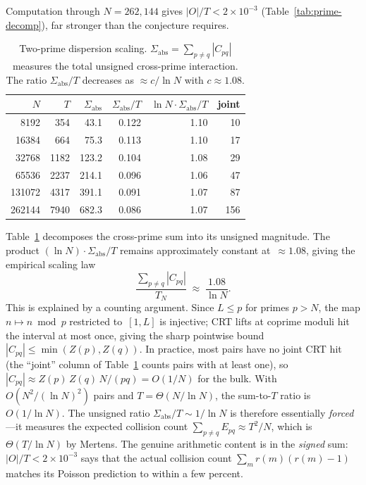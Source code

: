 \documentclass[11pt]{article}
\theoremstyle{definition}
\theoremstyle{remark}
\begin{document}
\noindent
Computation through $N = 262{,}144$
gives $|O|/T < 2 \times 10^{-3}$
(Table~\ref{tab:prime-decomp}),
far stronger than the
conjecture requires.

\begin{table}[ht]
\centering\small
\caption{Two-prime dispersion scaling.
$\Sigma_{\mathrm{abs}} =
\sum_{p \ne q} |C_{pq}|$
measures the total unsigned
cross-prime interaction.
The ratio
$\Sigma_{\mathrm{abs}}/T$
decreases as $\approx c/\ln N$
with $c \approx 1.08$.}
\label{tab:two-prime-scaling}
\begin{tabular}{rrrrrr}
\toprule
$N$ & $T$ &
$\Sigma_{\mathrm{abs}}$ &
$\Sigma_{\mathrm{abs}}/T$ &
$\ln N \cdot \Sigma_{\mathrm{abs}}/T$ &
joint \\
\midrule
8192 & 354 & 43.1 & 0.122 & 1.10 & 10 \\
16384 & 664 & 75.3 & 0.113 & 1.10 & 17 \\
32768 & 1182 & 123.2 & 0.104 & 1.08 & 29 \\
65536 & 2237 & 214.1 & 0.096 & 1.06 & 47 \\
131072 & 4317 & 391.1 & 0.091 & 1.07 & 87 \\
262144 & 7940 & 682.3 & 0.086 & 1.07 & 156 \\
\bottomrule
\end{tabular}
\end{table}

\noindent
Table~\ref{tab:two-prime-scaling}
decomposes the cross-prime sum
into its unsigned magnitude.
The product
$(\ln N) \cdot \Sigma_{\mathrm{abs}}/T$
remains approximately constant
at~$\approx 1.08$, giving the
empirical scaling law
\[
\frac{\sum_{p \ne q} |C_{pq}|}{T_N}
\;\approx\;
\frac{1.08}{\ln N}.
\]
This is explained by a counting argument.
Since $L \le p$ for primes $p > N$,
the map $n \mapsto n \bmod p$ restricted
to~$[1, L]$ is injective; CRT lifts at
coprime moduli hit the interval at
most once, giving the sharp pointwise bound
$|C_{pq}| \le \min(Z(p), Z(q))$.
In practice, most pairs have no joint
CRT hit (the ``joint'' column of
Table~\ref{tab:two-prime-scaling}
counts pairs with at least one),
so $|C_{pq}| \approx Z(p)\,Z(q)\,N/(pq)
= O(1/N)$ for the bulk.
With $O(N^2/(\ln N)^2)$ pairs and
$T = \Theta(N/\ln N)$, the sum-to-$T$
ratio is~$O(1/\ln N)$.
The unsigned ratio $\Sigma_{\mathrm{abs}}/T
\sim 1/\!\ln N$ is therefore essentially
\emph{forced}---it measures the expected
collision count $\sum_{p \ne q}
E_{pq} \approx T^2/N$,
which is $\Theta(T/\!\ln N)$ by Mertens.
The genuine arithmetic content is in
the \emph{signed} sum: $|O|/T < 2 \times 10^{-3}$
says that the actual collision count
$\sum_m r(m)(r(m){-}1)$ matches its
Poisson prediction to within a few percent.
\end{document}
